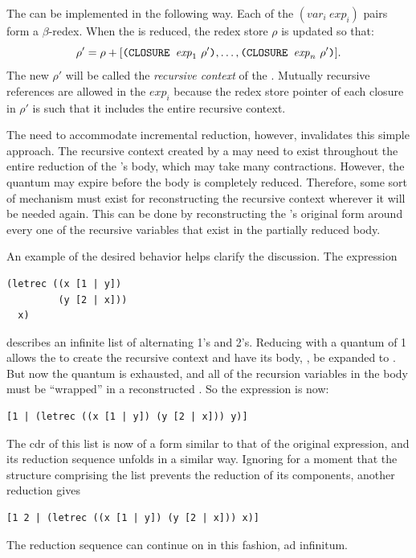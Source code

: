 The  can be implemented in the following way. Each of the
\((\mathit{var}_i\ \mathit{exp}_i)\) pairs form a \(\beta\)-redex. When the  is
reduced, the redex store \(\rho\) is updated so that:
\[
\rho'=\rho+[\THOR{(CLOSURE }\mathit{exp}_1\ \rho'\THOR{)},\ldots,
             \THOR{(CLOSURE }\mathit{exp}_n\ \rho'\THOR{)}].
\]
The new \(\rho'\) will be called the \emph{recursive context} of the .
Mutually recursive references are allowed in the \(\mathit{exp}_i\) because the redex
store pointer of each closure in \(\rho'\) is such that it includes the entire
recursive context.

The need to accommodate incremental reduction, however, invalidates this simple
approach. The recursive context created by a  may need to exist
throughout the entire reduction of the 's body, which may take many
contractions. However, the quantum may expire before the body is completely
reduced. Therefore, some sort of mechanism must exist for reconstructing the
recursive context wherever it will be needed again. This can be done by
reconstructing the 's original form around every one of the
recursive variables that exist in the partially reduced body.

An example of the desired behavior helps clarify the discussion. The expression
\begin{verbatim}
(letrec ((x [1 | y])
         (y [2 | x]))
  x)
\end{verbatim}
describes an infinite list of alternating 1's and 2's. Reducing with a quantum
of 1 allows the  to create the recursive context and have its body,
, be expanded to \THOR{([1 | y])}. But now the quantum is exhausted, and
all of the recursion variables in the body must be ``wrapped'' in a
reconstructed . So the expression is now:
\begin{verbatim}
[1 | (letrec ((x [1 | y]) (y [2 | x])) y)]
\end{verbatim}
The cdr of this list is now of a form similar to that of the original
expression, and its reduction sequence unfolds in a similar way. Ignoring for a
moment that the  structure comprising the list prevents the reduction
of its components, another reduction gives
\begin{verbatim}
[1 2 | (letrec ((x [1 | y]) (y [2 | x])) x)]
\end{verbatim}
The reduction sequence can continue on in this fashion, ad infinitum.

